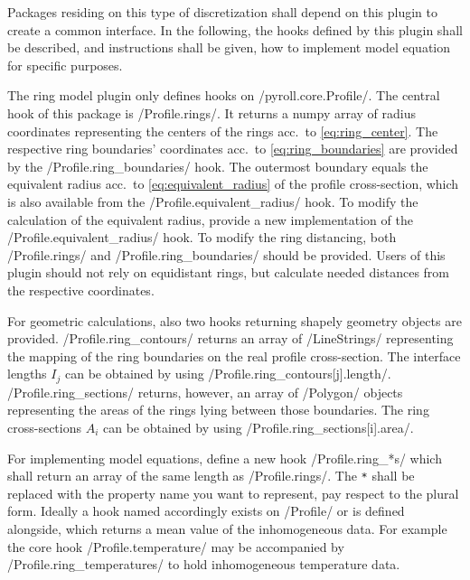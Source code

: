 \documentclass[11pt]{PyRollDocs}
\begin{document}
    Packages residing on this type of discretization shall depend on this plugin to create a common interface.
    In the following, the hooks defined by this plugin shall be described, and instructions shall be given, how to implement model equation for specific purposes.

    The ring model plugin only defines hooks on \py/pyroll.core.Profile/.
    The central hook of this package is \py/Profile.rings/.
    It returns a numpy array of radius coordinates representing the centers of the rings acc.\ to \autoref{eq:ring_center}.
    The respective ring boundaries' coordinates acc.\ to \autoref{eq:ring_boundaries}  are provided by the \py/Profile.ring_boundaries/ hook.
    The outermost boundary equals the equivalent radius acc.\ to \autoref{eq:equivalent_radius}  of the profile cross-section, which is also available from the \py/Profile.equivalent_radius/ hook.
    To modify the calculation of the equivalent radius, provide a new implementation of the \py/Profile.equivalent_radius/ hook.
    To modify the ring distancing, both \py/Profile.rings/ and \py/Profile.ring_boundaries/ should be provided.
    Users of this plugin should not rely on equidistant rings, but calculate needed distances from the respective coordinates.

    For geometric calculations, also two hooks returning shapely geometry objects are provided.
    \py/Profile.ring_contours/ returns an array of \py/LineStrings/ representing the mapping of the ring boundaries on the real profile cross-section.
    The interface lengths $I_j$ can be obtained by using \py/Profile.ring_contours[j].length/.
    \py/Profile.ring_sections/ returns, however, an array of \py/Polygon/ objects representing the areas of the rings lying between those boundaries.
    The ring cross-sections $A_i$ can be obtained by using \py/Profile.ring_sections[i].area/.

    For implementing model equations, define a new hook \py/Profile.ring_*s/ which shall return an array of the same length as \py/Profile.rings/.
    The \texttt{*} shall be replaced with the property name you want to represent, pay respect to the plural form.
    Ideally a hook named accordingly exists on \py/Profile/ or is defined alongside, which returns a mean value of the inhomogeneous data.
    For example the core hook \py/Profile.temperature/ may be accompanied by \py/Profile.ring_temperatures/ to hold inhomogeneous temperature data.

    \printbibliography
\end{document}
